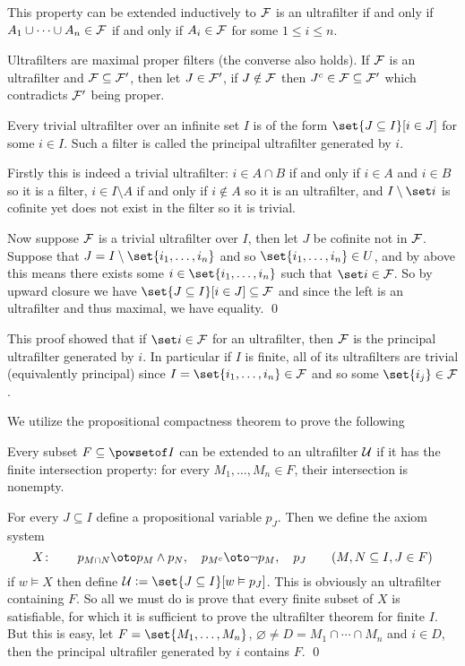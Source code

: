 This property can be extended inductively to ${\cal F}$ is an ultrafilter if and only if $A_1\cup\cdots\cup A_n\in{\cal F}$ if and only if $A_i\in{\cal F}$ for some $1\leq i\leq n$.

Ultrafilters are maximal proper filters (the converse also holds).
If ${\cal F}$ is an ultrafilter and ${\cal F}\subseteq{\cal F}'$, then let $J\in{\cal F}'$, if $J\notin{\cal F}$ then $J^c\in{\cal F}\subseteq{\cal F}'$ which contradicts ${\cal F}'$ being proper.

\bprop

    Every trivial ultrafilter over an infinite set $I$ is of the form $\set{J\subseteq I}[i\in J]$ for some $i\in I$.
    Such a filter is called the {\emphcolor principal ultrafilter} generated by $i$.

\eprop

Firstly this is indeed a trivial ultrafilter: $i\in A\cap B$ if and only if $i\in A$ and $i\in B$ so it is a filter, $i\in I\setminus A$ if and only if $i\notin A$ so it is an ultrafilter, and
$I\setminus\set i$ is cofinite yet does not exist in the filter so it is trivial.

Now suppose ${\cal F}$ is a trivial ultrafilter over $I$, then let $J$ be cofinite not in ${\cal F}$.
Suppose that $J=I\setminus\set{i_1,\dots,i_n}$ and so $\set{i_1,\dots,i_n}\in U$, and by above this means there exists some $i\in\set{i_1,\dots,i_n}$ such that $\set i\in{\cal F}$.
So by upward closure we have $\set{J\subseteq I}[i\in J]\subseteq{\cal F}$ and since the left is an ultrafilter and thus maximal, we have equality.
\qed

This proof showed that if $\set i\in{\cal F}$ for an ultrafilter, then ${\cal F}$ is the principal ultrafilter generated by $i$.
In particular if $I$ is finite, all of its ultrafilters are trivial (equivalently principal) since $I=\set{i_1,\dots,i_n}\in{\cal F}$ and so some $\set{i_j}\in{\cal F}$.

We utilize the propositional compactness theorem to prove the following

\bthrm[title=The Ultrafilter Theorem, name=ultrafiltertheorem]

    Every subset $F\subseteq\powsetof I$ can be extended to an ultrafilter ${\cal U}$ if it has the {\emphcolor finite intersection property}: for every $M_1,\dots,M_n\in F$, their intersection is nonempty.

\ethrm

For every $J\subseteq I$ define a propositional variable $p_J$.
Then we define the axiom system
$$ X\colon\qquad p_{M\cap N}\oto p_M\land p_N,\quad p_{M^c}\oto\neg p_M,\quad p_J\qquad(M,N\subseteq I,J\in F) $$
if $w\vDash X$ then define ${\cal U}\coloneqq\set{J\subseteq I}[w\vDash p_J]$.
This is obviously an ultrafilter containing $F$.
So all we must do is prove that every finite subset of $X$ is satisfiable, for which it is sufficient to prove the ultrafilter theorem for finite $I$.
But this is easy, let $F=\set{M_1,\dots,M_n}$, $\varnothing\neq D=M_1\cap\cdots\cap M_n$ and $i\in D$, then the principal ultrafiler generated by $i$ contains $F$.
\qed

